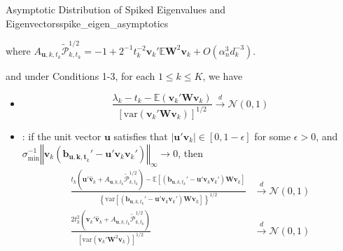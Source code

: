 \documentclass[twoside]{article}
\begin{document}
\begin{theorem}{Asymptotic Distribution of Spiked Eigenvalues and Eigenvectors}{spike_eigen_asymptotics}
\begin{itemize}
\begin{equation*}
        \end{equation*}
        where $A_{\mathbf{u},k,t_k}\tilde{\mathcal{P}}_{k,t_k}^{1/2} = -1 + 2^{-1} t_k^{-2} \mathbf{v}_k' \mathbb{E}\mathbf{W}^2 \mathbf{v}_k + O(\alpha_n^3 d_k^{-3})$.
    \end{itemize}
    and under Conditions 1-3, for each $1\leq k \leq K$, we have 
    \begin{itemize}
        \item {} $$ \frac{\lambda_k - t_k - \mathbb{E}\left(\mathbf{v}_k'\mathbf{W}\mathbf{v}_k\right)}{\left[\mathrm{var}\left(\mathbf{v}_k'\mathbf{W}\mathbf{v}_k\right)\right]^{1/2}} \xrightarrow{d}\mathcal{N}(0,1) $$
        \item {}: if the unit vector $\mathbf{u}$ satisfies that $\left\vert \mathbf{u}'\mathbf{v}_k \right\vert \in \left[0,1-\epsilon\right]$ for some $\epsilon>0$, and $\sigma_{\min}^{-1}\left\Vert \mathbf{v}_k\left(\mathbf{b}_{\mathbf{u,k,t}_k}'-\mathbf{u}'\mathbf{v}_k\mathbf{v}_k'\right) \right\Vert _{\infty} \rightarrow 0$, then 
        \begin{align*}
            \frac{t_k\left( \mathbf{u}'\hat{\mathbf{v}}_k + A_{\mathbf{u},k,t_k}\tilde{\mathcal{P}}^{1/2}_{k,t_k} \right) - \mathbb{E}\left[ \left( \mathbf{b}_{\mathbf{u},k,t_k}' - \mathbf{u}' \mathbf{v}_k\mathbf{v}_k' \right) \mathbf{Wv}_k \right] }{ \left\{ \mathrm{var} \left[ \left( \mathbf{b}_{\mathbf{u},k,t_k}' - \mathbf{u}' \mathbf{v}_k\mathbf{v}_k' \right) \mathbf{Wv}_k \right] \right\}^{1/2}} &\xrightarrow{d}\mathcal{N}(0,1)\\
            \frac{2t_k^2 \left( \mathbf{v}_k'\hat{\mathbf{v}}_k + A_{\mathbf{u},k,t_k} \tilde{\mathcal{P}}^{1/2}_{k,t_k} \right)}{ \left[ \mathrm{var}\left( \mathbf{v}_k' \mathbf{W}^2 \mathbf{v}_k \right) \right]^{1/2} } &\xrightarrow{d} \mathcal{N}(0,1)
        \end{align*}
    \end{itemize}
\end{theorem}
\end{document}
